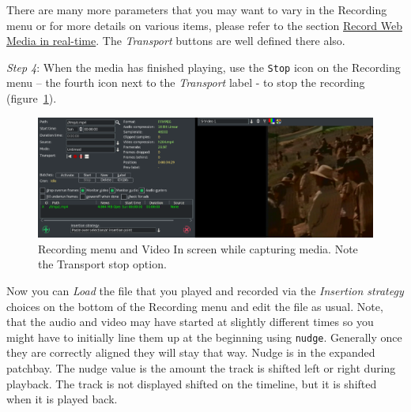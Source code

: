 There are many more parameters that you may want to vary in the Recording menu or for more details on various items, please refer to the section \hyperref[sec:record_web_media_rt]{Record Web Media in real-time}. The \textit{Transport} buttons are well defined there also.

\textit{Step 4}: When the media has finished playing, use the \texttt{Stop} icon on the Recording menu – the fourth icon next to the \textit{Transport} label - to stop the recording (figure~\ref{fig:vhs02}).

\begin{figure}[htpb]
    \centering
    \includegraphics[width=0.9\linewidth]{images/vhs02.png}
    \caption{Recording menu and Video In screen while capturing media.  Note the Transport stop option.}
    \label{fig:vhs02}
\end{figure}

Now you can \textit{Load} the file that you played and recorded via the \textit{Insertion strategy} choices on the bottom of the Recording menu and edit the file as usual.  Note, that the audio and video may have started at slightly different times so you might have to initially line them up at the beginning using \texttt{nudge}.  Generally once they are correctly aligned they will stay that way.  Nudge is in the expanded patchbay. The nudge value is the amount the track is shifted left or right during playback. The track is not displayed shifted on the timeline, but it is shifted when it is played back.

